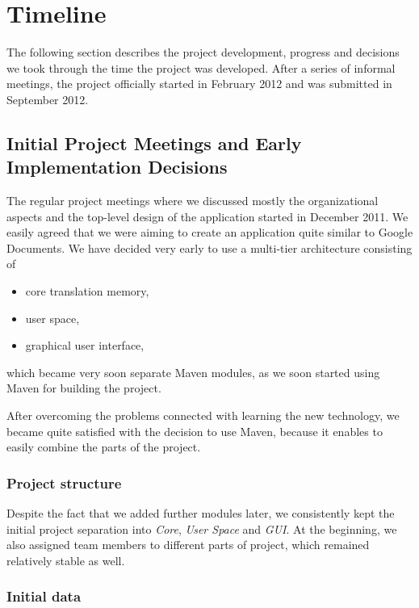 \section{Timeline}

The following section describes the project development, progress and decisions we took through the time the project was developed. After a series of informal meetings, the project officially started in February 2012 and was submitted in September 2012.

\subsection{Initial Project Meetings and Early Implementation Decisions}

The regular project meetings where we discussed mostly the organizational aspects and the top-level design of the application started in December 2011. We easily agreed that we were aiming to create an application quite similar to Google Documents. We have decided very early to use a multi-tier architecture consisting of

\begin{itemize}
\item core translation memory,
\item user space,
\item graphical user interface,
\end{itemize}

\noindent which became very soon separate Maven modules, as we soon started using Maven for building the project.

After overcoming the problems connected with learning the new technology, we became quite satisfied with the decision to use Maven, because it enables to easily combine the parts of the project.

\subsubsection{Project structure}

Despite the fact that we added further modules later, we consistently kept the initial project separation into \emph{Core}, \emph{User Space} and \emph{GUI}. At the beginning, we also assigned team members to different parts of project, which remained relatively stable as well.

\subsubsection{Initial data}

